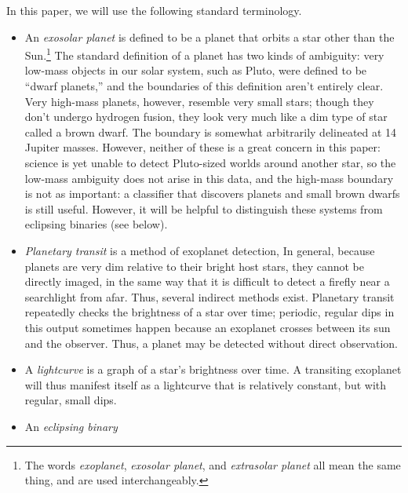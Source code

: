 \documentclass{amsart}
\begin{document}
In this paper, we will use the following standard terminology.
\begin{itemize}
	\item An \emph{exosolar planet} is defined to be a planet that orbits a star other than the Sun.\footnote{The words \emph{exoplanet}, \emph{exosolar planet}, and \emph{extrasolar planet} all mean the same thing, and are used interchangeably.} The standard definition of a planet has two kinds of ambiguity: very low-mass objects in our solar system, such as Pluto, were defined to be ``dwarf planets,'' and the boundaries of this definition aren't entirely clear. Very high-mass planets, however, resemble very small stars; though they don't undergo hydrogen fusion, they look very much like a dim type of star called a brown dwarf. The boundary is somewhat arbitrarily delineated at 14 Jupiter masses. However, neither of these is a great concern in this paper: science is yet unable to detect Pluto-sized worlds around another star, so the low-mass ambiguity does not arise in this data, and the high-mass boundary is not as important: a classifier that discovers planets and small brown dwarfs is still useful. However, it will be helpful to distinguish these systems from eclipsing binaries (see below).
	\item \emph{Planetary transit} is a method of exoplanet detection, In general, because planets are very dim relative to their bright host stars, they cannot be directly imaged, in the same way that it is difficult to detect a firefly near a searchlight from afar. Thus, several indirect methods exist. Planetary transit repeatedly checks the brightness of a star over time; periodic, regular dips in this output sometimes happen because an exoplanet crosses between its sun and the observer. Thus, a planet may be detected without direct observation.
	\item A \emph{lightcurve} is a graph of a star's brightness over time. A transiting exoplanet will thus manifest itself as a lightcurve that is relatively constant, but with regular, small dips.
	\item An \emph{eclipsing binary}
\end{itemize}

\end{document}
